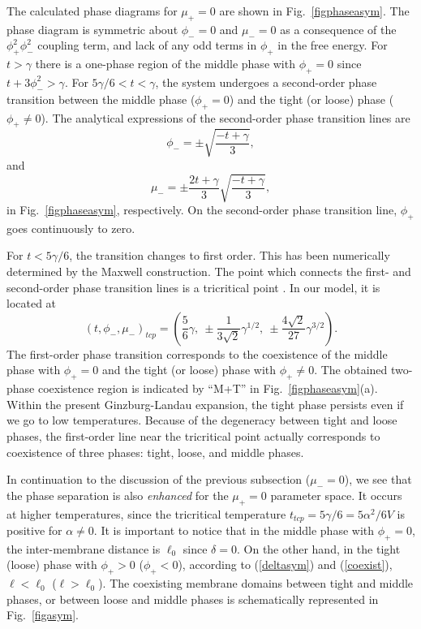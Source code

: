 The calculated phase diagrams for $\mu_+=0$ are shown
in Fig.\ \ref{figphaseasym}.
The phase diagram is symmetric about $\phi_-=0$ and
$\mu_- = 0$ as a consequence of the $\phi_+^2 \phi_-^2$
coupling term, and lack of any odd terms in $\phi_+$ in the free energy.
For $t > \gamma$ there is a one-phase region of the
middle phase with $\phi_+=0$ since $t+3\phi_-^2>\gamma$.
For $5\gamma/6 < t < \gamma$, the system undergoes a second-order phase
transition between the middle phase ($\phi_+=0$) and the tight (or loose)
phase ($\phi_+ \neq 0$).
The analytical expressions of the second-order phase transition lines are
%
\begin{equation}
\phi_- = \pm \sqrt{\frac{-t+\gamma}{3}},
\end{equation}
%
and
%
\begin{equation}
\mu_- = \pm \frac{2t+\gamma}{3}\sqrt{\frac{-t+\gamma}{3}},
\end{equation}
%
in Fig.\ \ref{figphaseasym}, respectively.
On the second-order phase transition line, $\phi_+$ goes continuously
to zero.


For $t < 5\gamma/6$, the transition changes to first order.
This has been numerically determined by the Maxwell construction.
The point which connects the first- and second-order phase transition
lines is a tricritical point \cite{CL}.
In our model, it is located at
%
\begin{equation}
(t,\phi_-, \mu_-)_{tcp}=\left( \frac{5}{6}\gamma,~
\pm \frac{1}{3\sqrt{2}}\gamma^{1/2},~
\pm \frac{4\sqrt{2}}{27}\gamma^{3/2} \right).
\end{equation}
%
The first-order phase transition corresponds to the coexistence of
the middle phase with $\phi_+=0$ and the tight (or loose) phase
with $\phi_+ \neq 0$. The obtained two-phase coexistence region is
indicated by ``M+T'' in Fig.\ \ref{figphaseasym}(a). Within the
present Ginzburg-Landau expansion, the tight phase persists even
if we go to low temperatures. Because of the degeneracy between
tight and loose phases, the first-order line near the tricritical
point actually corresponds to coexistence of three phases: tight,
loose, and middle phases.


In continuation to the discussion of the previous subsection
($\mu_-=0$), we see that the phase separation is also {\it
enhanced} for the $\mu_+=0$ parameter space. It occurs at higher
temperatures, since the tricritical temperature $t_{tcp}=
5\gamma/6 = 5\alpha^2/6V$ is positive for $\alpha \neq 0$. It is
important to notice that in the middle phase with $\phi_+=0$, the
inter-membrane distance is $\ell_0$ since $\delta=0$. On the other
hand, in the tight (loose) phase with $\phi_+ > 0$ ($\phi_+ < 0$),
according to (\ref{deltasym}) and (\ref{coexist}), $\ell < \ell_0$
($\ell > \ell_0$). The coexisting membrane domains between tight
and middle phases, or between loose and middle phases is
schematically represented in Fig.\ \ref{figasym}.


